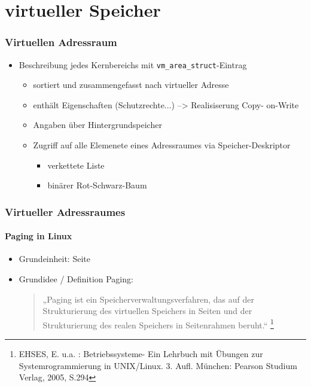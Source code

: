 \documentclass[ddcfooter,nosectionnum]{tudbeamer}
\begin{document}
\section{virtueller Speicher}
\begin{frame}
    \frametitle{Virtuellen Adressraum}
    \begin{itemize}
    	    \item Beschreibung jedes Kernbereichs mit \texttt{vm\_area\_struct}-Eintrag 
   		\begin{itemize}
			 \item sortiert und zusammengefasst nach virtueller Adresse\\
			\item enthält Eigenschaften (Schutzrechte...)
			--> Realisiserung Copy- on-Write
			\item Angaben über Hintergrundspeicher
    			\item Zugriff auf alle Elemenete eines Adressraumes via Speicher-Deskriptor
			\begin{itemize}
				\item verkettete Liste
				\item binärer Rot-Schwarz-Baum
			\end{itemize}
   		\end{itemize} 
	\end{itemize}
    
\end{frame}

\begin{frame}
    \frametitle{Virtueller Adressraumes}
    \framesubtitle {Paging in Linux}
    \begin{itemize}
         \item  Grundeinheit: Seite
         \item Grundidee / Definition Paging: \\
        \begin{quote}
         „Paging ist ein Speicherverwaltungsverfahren, das auf der Strukturierung  des virtuellen Speichers 	in Seiten und der Strukturierung des realen Speichers in Seitenrahmen beruht.“
         \footnote{EHSES, E. u.a. : Betriebssysteme- Ein Lehrbuch mit Übungen zur Systemrogrammierung in UNIX/Linux. 3. Aufl. München: Pearson Studium Verlag, 2005, S.294}
	\end{quote}
 	
	
    
    
     \end{itemize}
    
\end{frame}
\end{document}
